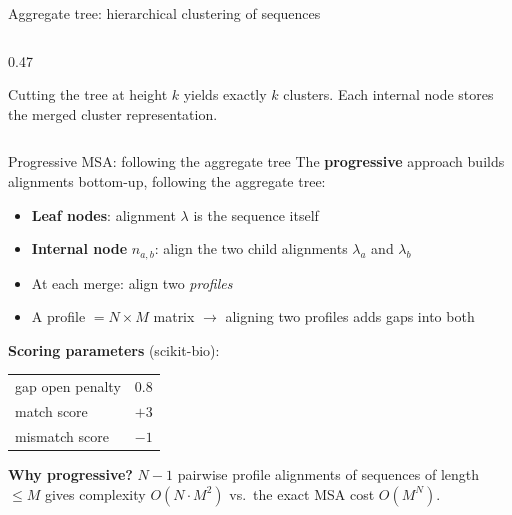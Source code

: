 \documentclass[aspectratio=169,t]{beamer}
\begin{document}
\begin{frame}[shrink=5]{Aggregate tree: hierarchical clustering of sequences}
\begin{columns}[T]
\begin{column}{0.47\textwidth}
\begin{center}
      \end{center}
      {\footnotesize Cutting the tree at height $k$ yields exactly $k$ clusters. Each internal node stores the merged cluster representation.}
    \end{column}
  \end{columns}
\end{frame}

\begin{frame}{Progressive MSA: following the aggregate tree}
  The \textbf{progressive} approach builds alignments bottom-up, following the aggregate tree:
  \begin{itemize}
    \item \textbf{Leaf nodes}: alignment $\lambda$ is the sequence itself
    \item \textbf{Internal node} $n_{a,b}$: align the two child alignments $\lambda_a$ and $\lambda_b$
    \item At each merge: align two \emph{profiles}
    \item A profile $= N \times M$ matrix $\to$ aligning two profiles adds gaps into both
  \end{itemize}
  \vspace{0.3cm}
  \textbf{Scoring parameters} (scikit-bio):
  \begin{center}
  \begin{tabular}{ll}
    \toprule
    gap open penalty & $0.8$ \\
    match score       & $+3$ \\
    mismatch score    & $-1$ \\
    \bottomrule
  \end{tabular}
  \end{center}
  \textbf{Why progressive?} $N-1$ pairwise profile alignments of sequences of length $\leq M$ gives complexity $O(N \cdot M^2)$ vs.\ the exact MSA cost $O(M^N)$.
\end{frame}
\end{document}
